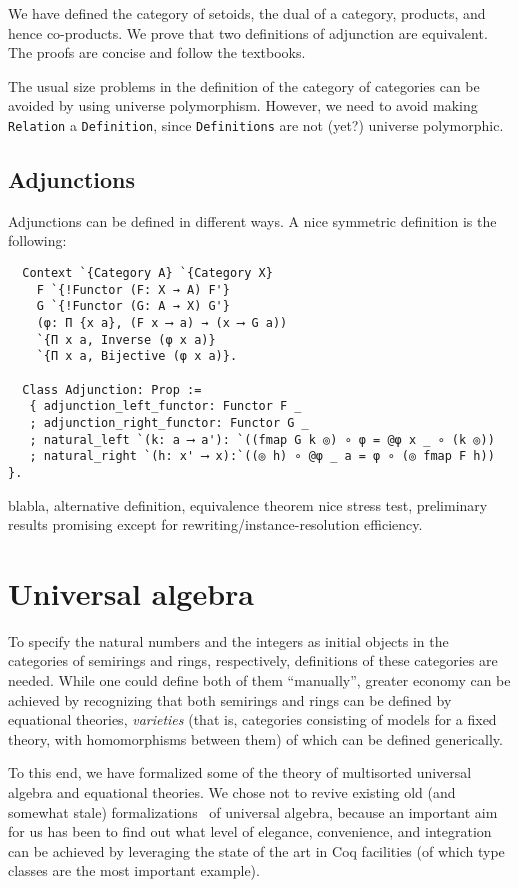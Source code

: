 \documentclass[a4paper,10pt,runningheads]{llncs}
\begin{document}
We have defined the category of setoids, the dual of a category, products, and hence co-products. 
We prove that two definitions of adjunction are equivalent. The proofs are concise and follow the textbooks.

The usual size problems in the definition of the category of categories can be avoided by using universe polymorphism. 
However, we need to avoid making \lstinline|Relation| a \lstinline|Definition|, since \lstinline|Definitions| are not (yet?) universe polymorphic.

\subsection{Adjunctions}

Adjunctions can be defined in different ways. A nice symmetric definition is the following:

\begin{lstlisting}
  Context `{Category A} `{Category X}
    F `{!Functor (F: X → A) F'}
    G `{!Functor (G: A → X) G'}
    (φ: Π {x a}, (F x ⟶ a) → (x ⟶ G a))
    `{Π x a, Inverse (φ x a)}
    `{Π x a, Bijective (φ x a)}.

  Class Adjunction: Prop :=
   { adjunction_left_functor: Functor F _
   ; adjunction_right_functor: Functor G _
   ; natural_left `(k: a ⟶ a'): `((fmap G k ◎) ∘ φ = @φ x _ ∘ (k ◎))
   ; natural_right `(h: x' ⟶ x):`((◎ h) ∘ @φ _ a = φ ∘ (◎ fmap F h)) }.
\end{lstlisting}

blabla, alternative definition, equivalence theorem nice stress test, preliminary results promising except for rewriting/instance-resolution efficiency.

\section{Universal algebra}\label{univ}

To specify the natural numbers and the integers as initial objects in the categories of semirings and rings, respectively, definitions of these categories are needed. While one could define both of them ``manually'', greater economy can be achieved by recognizing that both semirings and rings can be defined by equational theories, \emph{varieties} (that is, categories consisting of models for a fixed theory, with homomorphisms between them) of which can be defined generically.

To this end, we have formalized some of the theory of multisorted universal algebra and equational theories. We chose not to revive existing old (and somewhat stale) formalizations~\cite{DBLP:conf/tphol/Capretta99,dominguez2008formalizing} of universal algebra, because an important aim for us has been to find out what level of elegance, convenience, and integration can be achieved by leveraging the state of the art in Coq facilities (of which type classes are the most important example).
\end{document}
